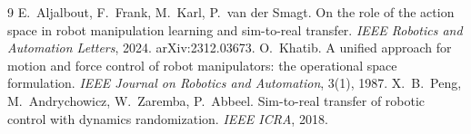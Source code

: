 {\raggedright
\begin{thebibliography}{9}
 E.~Aljalbout, F.~Frank, M.~Karl, P.~van der Smagt. On the role of the action space in
  robot manipulation learning and sim-to-real transfer. \emph{IEEE Robotics and Automation Letters}, 2024.
  arXiv:2312.03673.
 O.~Khatib. A unified approach for motion and force control of robot manipulators: the
  operational space formulation. \emph{IEEE Journal on Robotics and Automation}, 3(1), 1987.
 X.~B.~Peng, M.~Andrychowicz, W.~Zaremba, P.~Abbeel. Sim-to-real transfer of robotic control
  with dynamics randomization. \emph{IEEE ICRA}, 2018.
\end{thebibliography}
}
